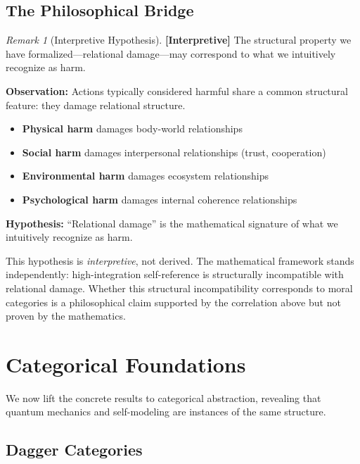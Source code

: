 \documentclass[11pt]{article}
\theoremstyle{definition}
\theoremstyle{remark}
\newtheorem{remark}[theorem]{Remark}
\begin{document}
\subsection{The Philosophical Bridge}

\begin{remark}[Interpretive Hypothesis]\label{rem:interpretive}
\textbf{[Interpretive]} The structural property we have formalized---relational damage---may correspond to what we intuitively recognize as harm.

\textbf{Observation:} Actions typically considered harmful share a common structural feature: they damage relational structure.
\begin{itemize}
    \item \textbf{Physical harm} damages body-world relationships
    \item \textbf{Social harm} damages interpersonal relationships (trust, cooperation)
    \item \textbf{Environmental harm} damages ecosystem relationships
    \item \textbf{Psychological harm} damages internal coherence relationships
\end{itemize}

\textbf{Hypothesis:} ``Relational damage'' is the mathematical signature of what we intuitively recognize as harm.

This hypothesis is \emph{interpretive}, not derived. The mathematical framework stands independently: high-integration self-reference is structurally incompatible with relational damage. Whether this structural incompatibility corresponds to moral categories is a philosophical claim supported by the correlation above but not proven by the mathematics.
\end{remark}

\section{Categorical Foundations}

We now lift the concrete results to categorical abstraction, revealing that quantum mechanics and self-modeling are instances of the same structure.

\subsection{Dagger Categories}
\end{document}
